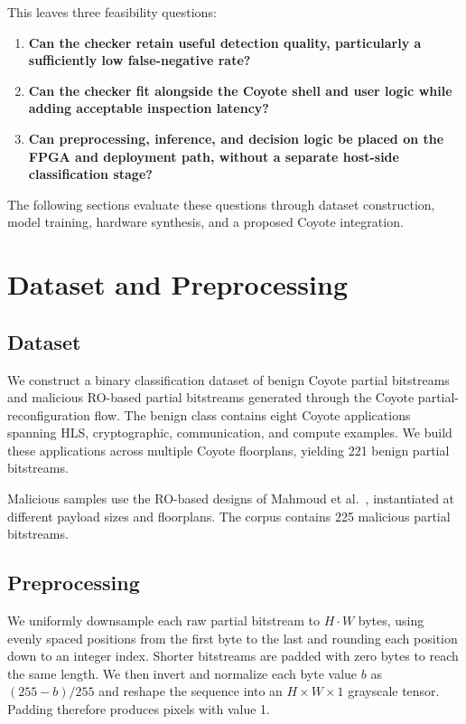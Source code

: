 \documentclass[acmsmall]{acmart}
\begin{document}
This leaves three feasibility questions:
\begin{enumerate}
    \item \textbf{Can the checker retain useful detection quality, particularly
    a sufficiently low false-negative rate?}

    \item \textbf{Can the checker fit alongside the Coyote shell and user logic
    while adding acceptable inspection latency?}

    \item \textbf{Can preprocessing, inference, and decision logic be placed on
    the FPGA and deployment path, without a separate host-side classification stage?}
\end{enumerate}

The following sections evaluate these questions through dataset construction,
model training, hardware synthesis, and a proposed Coyote integration.

\section{Dataset and Preprocessing}
\label{sec:method-dataset}

\subsection{Dataset}
\label{sec:method-dataset-generation}

We construct a binary classification dataset of benign Coyote partial bitstreams
and malicious RO-based partial bitstreams generated through the Coyote
partial-reconfiguration flow. The benign class contains eight Coyote applications
spanning HLS, cryptographic, communication, and compute examples. We build
these applications across multiple Coyote floorplans, yielding 221 benign partial
bitstreams.

Malicious samples use the RO-based designs of Mahmoud
et al.~\cite{mahmoud2023practical}, instantiated at different payload sizes and
floorplans. The corpus contains 225 malicious partial bitstreams.

\subsection{Preprocessing}
\label{sec:method-preprocessing}

We uniformly downsample each raw partial bitstream to $H \cdot W$ bytes,
using evenly spaced positions from the first byte to the last and rounding
each position down to an integer index. Shorter bitstreams are padded with
zero bytes to reach the same length. We then invert and normalize each byte
value $b$ as $(255-b)/255$ and reshape the sequence into an
$H \times W \times 1$ grayscale tensor. Padding therefore produces pixels
with value 1.
\end{document}
